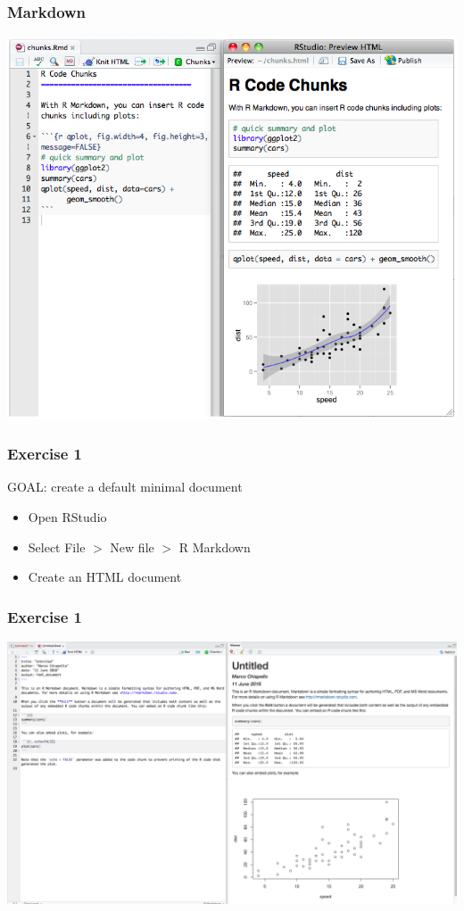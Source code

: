 \documentclass{beamer}
\begin{document}
\begin{frame}
    \frametitle{Markdown}
    \begin{center}\includegraphics[scale=0.35]{figures/RmarkdownExample2.png}\end{center}
\end{frame}
\begin{frame}
    \frametitle{Exercise 1}
    {\sc GOAL: create a default minimal document}
    \begin{itemize}
        \item Open RStudio
        \item Select File $>$ New file $>$ R Markdown
        \item Create an HTML document
    \end{itemize}
\end{frame}
\begin{frame}
    \frametitle{Exercise 1}
    \begin{center}\includegraphics[scale=0.23]{figures/RmarkdownExample.png}\end{center}
\end{frame}
\end{document}
